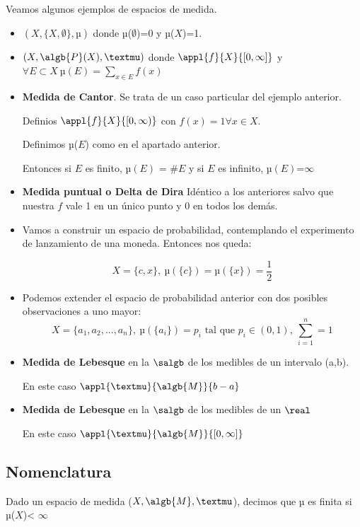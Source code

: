 \documentclass{apuntes}
\begin{document}
Veamos algunos ejemplos de espacios de medida.
\begin{example}
\begin{itemize}
\item $(X, \{X, \emptyset\}, µ)$ donde µ($\emptyset$)=0 y µ($X$)=1.

\item $(X, \algb{P}(X), µ)$ donde $\appl{f}{X}{[0, \infty]}$ y $\forall E \subset X \ µ(E)=\sum_{x \in E}f(x)$

\item \textbf{Medida de Cantor}. Se trata de un caso particular del ejemplo anterior.

Definios $\appl{f}{X}{[0, \infty)}$ con $f(x)=1 \forall x \in X$.

Definimos µ($E$) como en el apartado anterior.

Entonces si $E$ es finito, $µ(E)$ = \#$E$ y si $E$ es infinito, $µ(E)$=$\infty$

\item \textbf{Medida puntual o Delta de Dira}
Idéntico a los anteriores salvo que nuestra $f$ vale 1 en un único punto y 0 en todos los demás.

\item Vamos a construir un espacio de probabilidad, contemplando el experimento de lanzamiento de una moneda. Entonces nos queda:

\[X=\{c, x\}, \ µ(\{c\})=µ(\{x\})=\frac{1}{2}\]

\item Podemos extender el espacio de probabilidad anterior con dos posibles observaciones a uno mayor:
\[X=\{a_1, a_2, ..., a_n\}, \ µ(\{a_i\})=p_i \text{ tal que } p_i\in(0,1), \ \sum_{i=1}^{n}=1\]

\item \textbf{Medida de Lebesque} en la $\salgb$ de los medibles de un intervalo (a,b).

En este caso $\appl{µ}{\algb{M}}{b-a}$

\item \textbf{Medida de Lebesque} en la $\salgb$ de los medibles de un $\real$

En este caso $\appl{µ}{\algb{M}}{[0, \infty]}$

\end{itemize}

\subsection{Nomenclatura}
\begin{defn}
Dado un espacio de medida ($X, \algb{M}, µ$), decimos que µ es finita si µ($X$)< $\infty$
\end{defn}


\end{example}
\end{document}
